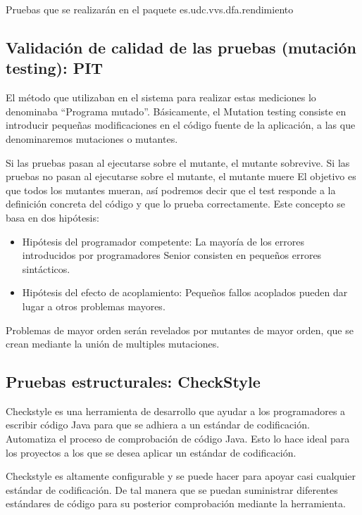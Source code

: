 \documentclass[DIV=calc,paper=a4,fontsize=11pt,onecolumn]{scrartcl} %
\begin{document}
	Pruebas que se realizarán en el paquete es.udc.vvs.dfa.rendimiento
	\subsection{Validación de calidad de las pruebas (mutación testing): PIT}
	
	El  método que utilizaban en el sistema para realizar estas mediciones lo denominaba “Programa mutado”.
	Básicamente, el Mutation testing consiste en introducir pequeñas modificaciones en el código fuente de la aplicación, a las que denominaremos mutaciones o mutantes.
	
	Si las pruebas pasan al ejecutarse sobre el mutante, el mutante sobrevive.
	Si las pruebas no pasan al ejecutarse sobre el mutante, el mutante muere
	El objetivo es que todos los mutantes mueran, así podremos decir que el test responde a la definición concreta del código y que lo prueba correctamente.
	Este concepto se basa en dos hipótesis:
	\begin{itemize}
		\item Hipótesis del programador competente: La mayoría de los errores introducidos por programadores Senior consisten en pequeños errores sintácticos.
		\item Hipótesis del efecto de acoplamiento: Pequeños fallos acoplados pueden dar lugar a otros problemas mayores.
	\end{itemize}
	Problemas de mayor orden serán revelados por mutantes de mayor orden, que se crean mediante la unión de multiples mutaciones.
	
	\subsection{Pruebas estructurales: CheckStyle}
	
	Checkstyle es una herramienta de desarrollo que ayudar a los programadores a escribir código Java para que se adhiera a un estándar de codificación. Automatiza el proceso de comprobación de código Java. Esto lo hace ideal para los proyectos a los que se desea aplicar un estándar de codificación.
	
	Checkstyle es altamente configurable y se puede hacer para apoyar casi cualquier estándar de codificación. De tal manera que se puedan suministrar diferentes estándares de código para su posterior comprobación mediante la herramienta.
	
\end{document}
